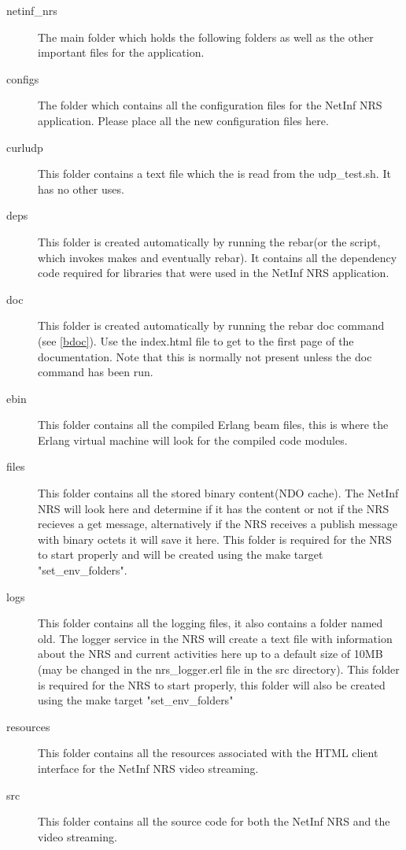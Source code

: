 \begin{description}
\item [netinf\_nrs]
The main folder which holds the following folders as well as the other important files for the application.
\item [configs]
The folder which contains all the configuration files for the NetInf NRS application. Please place all the new configuration files here. 
\item [curludp]
This folder contains a text file which the is read from the udp\_test.sh. It has no other uses.
\item [deps]
This folder is created automatically by running the rebar(or the script, which invokes makes and eventually rebar). It contains all the dependency code required for libraries that were used in the NetInf NRS application. 
\item [doc]
This folder is created automatically by running the rebar doc command (see \ref{bdoc}). Use the index.html file to get to the first page of the documentation. Note that this is normally not present unless the doc command has been run.
\item [ebin]
This folder contains all the compiled Erlang beam files, this is where the Erlang virtual machine will look for the compiled code modules.
\item [files]
This folder contains all the stored binary content(NDO cache). The NetInf NRS will look here and determine if it has the content or not if the NRS recieves a get message, alternatively if the NRS receives a publish message with binary octets it will save it here. This folder is required for the NRS to start properly and will be created using the make target "set\_env\_folders".
\item [logs]
This folder contains all the logging files, it also contains a folder named old. The logger service in the NRS will create a text file with information about the NRS and current activities here up to a default size of 10MB (may be changed in the nrs\_logger.erl file in the src directory). This folder is required for the NRS to start properly, this folder will also be created using the make target "set\_env\_folders"
\item [resources]
This folder contains all the resources associated with the HTML client interface for the NetInf NRS video streaming.
\item [src]
This folder contains all the source code for both the NetInf NRS and the video streaming.
\end{description}

